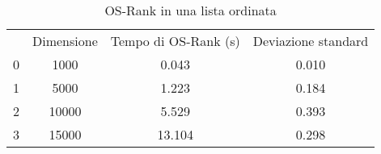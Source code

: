 \begin{table}[H]
\centering
\caption{OS-Rank in una lista ordinata}
\label{OS-Rank in una lista ordinata}
\begin{tabular}{cccc}
 & Dimensione & Tempo di OS-Rank (s) & Deviazione standard \\
0 & 1000 & 0.043 & 0.010 \\
\cline{1-4}
1 & 5000 & 1.223 & 0.184 \\
\cline{1-4}
2 & 10000 & 5.529 & 0.393 \\
\cline{1-4}
3 & 15000 & 13.104 & 0.298 \\
\cline{1-4}
\end{tabular}
\end{table}
